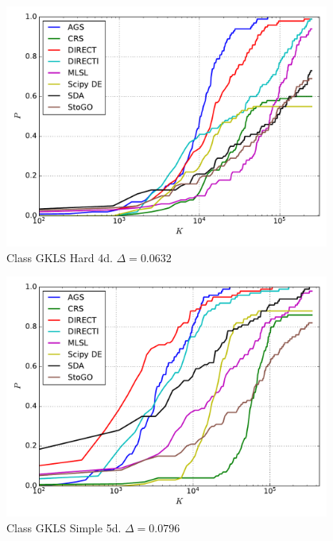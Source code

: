 \documentclass[a4paper]{article}
\begin{document}
\begin{figure}[H]
  \center
  \includegraphics[width=0.95\textwidth]{../experiments/gklsh4d_serg/cmc.pdf}
  \caption{Class GKLS Hard 4d. $\Delta=0.0632$}

\end{figure}


\begin{figure}[H]
  \center
  \includegraphics[width=0.95\textwidth]{../experiments/gklss5d_serg/cmc.pdf}
  \caption{Class GKLS Simple 5d. $\Delta=0.0796$}

\end{figure}

\end{document}
